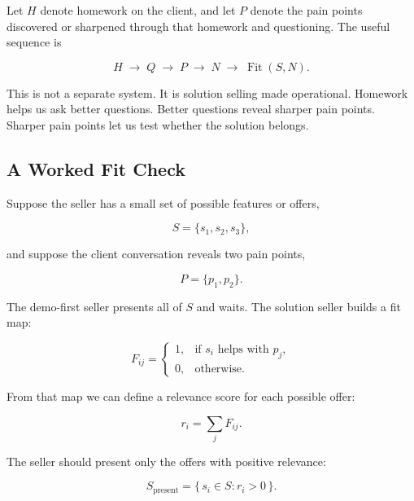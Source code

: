 Let \(H\) denote homework on the client, and let \(P\) denote the pain points discovered or sharpened through that homework and questioning. The useful sequence is

\begin{equation}
H
\;\longrightarrow\;
Q
\;\longrightarrow\;
P
\;\longrightarrow\;
N
\;\longrightarrow\;
\operatorname{Fit}(S,N).
\end{equation}

This is not a separate system. It is solution selling made operational. Homework helps us ask better questions. Better questions reveal sharper pain points. Sharper pain points let us test whether the solution belongs.

\subsection{A Worked Fit Check}

Suppose the seller has a small set of possible features or offers,

\begin{equation}
S=\{s_1,s_2,s_3\},
\end{equation}

and suppose the client conversation reveals two pain points,

\begin{equation}
P=\{p_1,p_2\}.
\end{equation}

The demo-first seller presents all of \(S\) and waits. The solution seller builds a fit map:

\begin{equation}
F_{ij}=
\begin{cases}
1, & \text{if } s_i \text{ helps with } p_j,\\
0, & \text{otherwise.}
\end{cases}
\end{equation}

From that map we can define a relevance score for each possible offer:

\begin{equation}
r_i=\sum_j F_{ij}.
\end{equation}

The seller should present only the offers with positive relevance:

\begin{equation}
S_{\mathrm{present}}
=
\{\,s_i \in S : r_i>0\,\}.
\end{equation}

